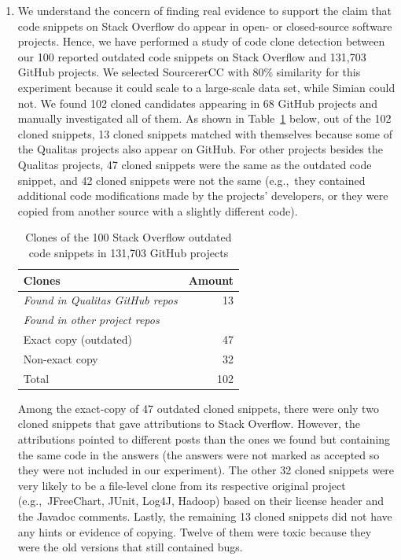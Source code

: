 \documentclass[a4paper,twoside,10pt]{reviewresponse}
\begin{document}
\begin{enumerate} \item We understand the concern of finding real evidence to
	support the claim that code snippets on Stack Overflow do appear in open- or
	closed-source software projects. Hence, we have performed a study of code clone
	detection between our 100 reported outdated code snippets on Stack Overflow and
	131,703 GitHub projects. We selected SourcererCC with 80\% similarity for this
	experiment because it could scale to a large-scale data set, while Simian could
	not. We found 102 cloned candidates appearing in 68 GitHub projects and manually
	investigated all of them. As shown in Table~\ref{tab:outdated_github} below, out
	of the 102 cloned snippets, 13 cloned snippets matched with
	themselves because some of the Qualitas projects also appear on GitHub. For
	other projects besides the Qualitas projects, 47 cloned snippets
	were the same as the outdated code snippet, and 42 cloned snippets
	were not the same (e.g.,~they contained additional code modifications
	made by the projects' developers, or they were copied from another source with a
	slightly different code).
	
	\begin{table}[H]
		\centering
		\begin{tabular}{lr}
			\toprule
			Clones & Amount \\
			\midrule
			\textit{Found in Qualitas GitHub repos} & 13 \\
			\midrule
			\textit{Found in other project repos} & \\
			Exact copy (outdated) & 47 \\
			Non-exact copy & 32 \\
			\midrule
			Total & 102 \\
			\bottomrule
		\end{tabular}
		\label{tab:outdated_github}
		\caption{Clones of the 100 Stack Overflow outdated code snippets in 131,703 GitHub projects}
	\end{table}

Among the exact-copy of 47 outdated cloned snippets, there were only two cloned
snippets that gave attributions to Stack Overflow. However, the attributions
pointed to different posts than the ones we found but containing the same code
in the answers (the answers were not marked as accepted so they were not included in our experiment). 
The other 32 cloned snippets were very likely to be a
file-level clone from its respective original project (e.g.,~JFreeChart, JUnit,
Log4J, Hadoop) based on their license header and the Javadoc comments. Lastly,
the remaining 13 cloned snippets did not have any hints or evidence of copying.
Twelve of them were toxic because they were the old versions that still
contained bugs.


\end{enumerate}
\end{document}
